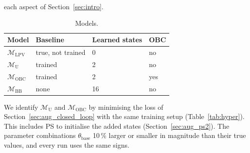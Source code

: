 each aspect of Section~\ref{sec:intro}.
\begin{table}[!h]
\caption{Models.}
\label{tab:setup_models}
\centering
\footnotesize
\begin{tabular}{@{}llll@{}}
\toprule
Model & Baseline & Learned states & OBC\\
\midrule
$\mathcal M_{\mathrm{LPV}}$ & true, not trained & 0 & no\\
$\mathcal M_{\mathrm{U}}$ & trained & 2 & no\\
$\mathcal M_{\mathrm{OBC}}$ & trained & 2 & yes\\
$\mathcal M_{\mathrm{BB}}$ & none & 16 & no\\
\bottomrule
\end{tabular}
\end{table}
We identify $\mathcal M_{\mathrm U}$ and $\mathcal M_{\mathrm{OBC}}$
by minimising the loss of Section~\ref{sec:aug_closed_loop} 
with the same training setup (Table~\ref{tab:hyper}).
This includes PS to initialise the added states (Section~\ref{sec:aug_ps2}).
The parameter combinations $\theta_{\mathrm{base}}$  10\,\% larger or
smaller in magnitude than their true values, and every run uses the same
signs.
%

